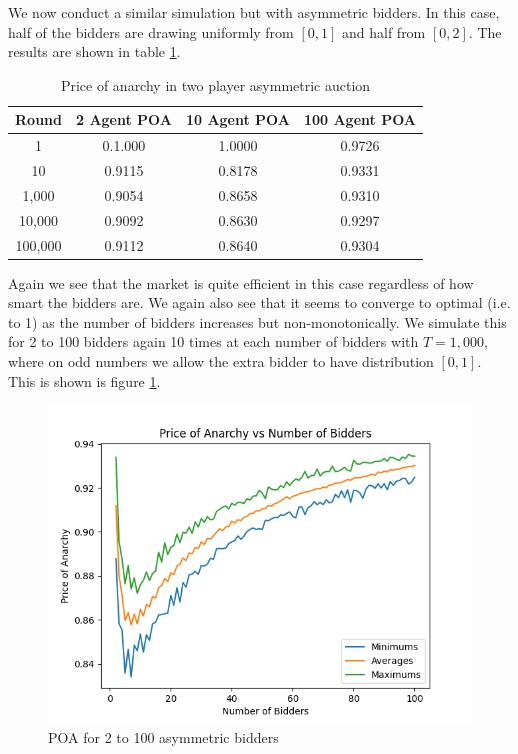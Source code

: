 \documentclass[12pt,twoside]{reedthesis}
\begin{document}
We now conduct a similar simulation but with asymmetric bidders. In this case, half of the bidders are drawing uniformly from $[0,1]$ and half from $[0,2]$. The results are shown in table \ref{table:zero_int_asymmetric}. 

\begin{table}[h!]
	\begin{center}
		\begin{tabular}{ |c|c|c|c| }
			\hline
			Round & 2 Agent POA & 10 Agent POA & 100 Agent POA \\
			\hline
			1 & 0.1.000 & 1.0000 & 0.9726\\
			10 & 0.9115 & 0.8178 & 0.9331\\
			1,000 & 0.9054 & 0.8658 & 0.9310\\
			10,000 & 0.9092 & 0.8630 & 0.9297\\
			100,000 & 0.9112 & 0.8640 & 0.9304\\
			\hline
		\end{tabular}
		\caption{Price of anarchy in two player asymmetric auction}
		\label{table:zero_int_asymmetric}
	\end{center} 
\end{table}

Again we see that the market is quite efficient in this case regardless of how smart the bidders are. We again also see that it seems to converge to optimal (i.e. to 1) as the number of bidders increases but non-monotonically. We simulate this for 2 to 100 bidders again 10 times at each number of bidders with $T = 1,000$, where on odd numbers we allow the extra bidder to have distribution $[0,1]$. This is shown is figure \ref{figure:zi_assymetric}.

\begin{figure}[h!]
	\centering
	\includegraphics[scale=0.8]{Figures/zi_asymmetric}
	\caption{POA for 2 to 100 asymmetric bidders}
	\label{figure:zi_assymetric}
\end{figure}
\end{document}
